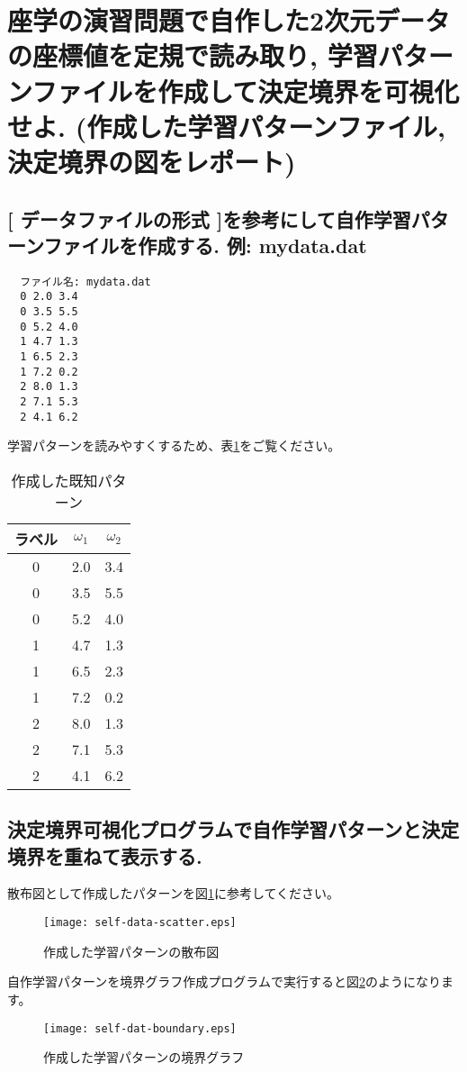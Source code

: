 \documentclass[a4j, twocolumn]{jarticle}
\begin{document}
\section{座学の演習問題で自作した2次元データの座標値を定規で読み取り, 学習パターンファイルを作成して決定境界を可視化せよ. (作成した学習パターンファイル, 決定境界の図をレポート)}
\subsection{[ データファイルの形式 ]を参考にして自作学習パターンファイルを作成する. 例: mydata.dat}
\begin{verbatim}
  ファイル名: mydata.dat
  0 2.0 3.4 
  0 3.5 5.5
  0 5.2 4.0
  1 4.7 1.3
  1 6.5 2.3
  1 7.2 0.2
  2 8.0 1.3
  2 7.1 5.3
  2 4.1 6.2
\end{verbatim}
学習パターンを読みやすくするため、表\ref{tab:self-dataset}をご覧ください。
\begin{table}[h]
  \centering
  \begin{tabular}{|c|c|c|}
    \hline
    ラベル & $\omega_1$ & $\omega_2$ \\
    \hline
    0 & 2.0 & 3.4 \\
    0 & 3.5 & 5.5 \\
    0 & 5.2 & 4.0 \\
    1 & 4.7 & 1.3 \\
    1 & 6.5 & 2.3 \\
    1 & 7.2 & 0.2 \\
    2 & 8.0 & 1.3 \\
    2 & 7.1 & 5.3 \\
    2 & 4.1 & 6.2 \\
    \hline
  \end{tabular}
  \caption{作成した既知パターン}\label{tab:self-dataset}
\end{table}
\subsection{決定境界可視化プログラムで自作学習パターンと決定境界を重ねて表示する.}
散布図として作成したパターンを図\ref{self-data-scatter}に参考してください。
\begin{figure}[h]
  \centering
  \texttt{[image: self-data-scatter.eps]}
  \caption{作成した学習パターンの散布図}\label{self-data-scatter}
\end{figure}
自作学習パターンを境界グラフ作成プログラムで実行すると図\ref{self-data-boundary}のようになります。
\begin{figure}[h]
  \centering
  \texttt{[image: self-dat-boundary.eps]}
  \caption{作成した学習パターンの境界グラフ}\label{self-data-boundary}
\end{figure}
\end{document}
